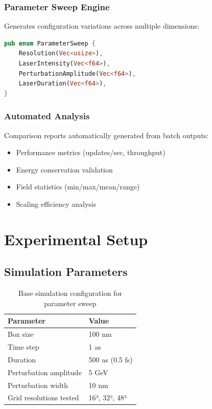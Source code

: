 \documentclass[12pt,a4paper]{article}
\begin{document}
\subsubsection{Parameter Sweep Engine}

Generates configuration variations across multiple dimensions:

\begin{lstlisting}[language=Rust, basicstyle=\small\ttfamily]
pub enum ParameterSweep {
    Resolution(Vec<usize>),
    LaserIntensity(Vec<f64>),
    PerturbationAmplitude(Vec<f64>),
    LaserDuration(Vec<f64>),
}
\end{lstlisting}

\subsubsection{Automated Analysis}

Comparison reports automatically generated from batch outputs:

\begin{itemize}
    \item Performance metrics (updates/sec, throughput)
    \item Energy conservation validation
    \item Field statistics (min/max/mean/range)
    \item Scaling efficiency analysis
\end{itemize}

\section{Experimental Setup}

\subsection{Simulation Parameters}

\begin{table}[H]
\centering
\begin{tabular}{@{}ll@{}}
\toprule
\textbf{Parameter} & \textbf{Value} \\
\midrule
Box size & 100 nm \\
Time step & 1 as \\
Duration & 500 as (0.5 fs) \\
Perturbation amplitude & 5 GeV \\
Perturbation width & 10 nm \\
Grid resolutions tested & 16³, 32³, 48³ \\
\bottomrule
\end{tabular}
\caption{Base simulation configuration for parameter sweep}
\end{table}
\end{document}
